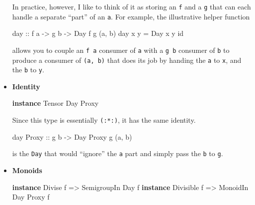 \documentclass[]{article}
\newenvironment{Shaded}{}{}
\newcommand{\DataTypeTok}[1]{\textcolor[rgb]{0.56,0.13,0.00}{#1}}
\newcommand{\FunctionTok}[1]{\textcolor[rgb]{0.02,0.16,0.49}{#1}}
\newcommand{\KeywordTok}[1]{\textcolor[rgb]{0.00,0.44,0.13}{\textbf{#1}}}
\newcommand{\NormalTok}[1]{#1}
\newcommand{\OtherTok}[1]{\textcolor[rgb]{0.00,0.44,0.13}{#1}}
\begin{document}
\begin{itemize}
  In practice, however, I like to think of it as storing an \texttt{f} and a
  \texttt{g} that can each handle a separate ``part'' of an \texttt{a}. For
  example, the illustrative helper function

\begin{Shaded}
\begin{Highlighting}[]
\OtherTok{day ::}\NormalTok{ f a }\OtherTok{{-}\textgreater{}}\NormalTok{ g b }\OtherTok{{-}\textgreater{}} \DataTypeTok{Day}\NormalTok{ f g (a, b)}
\NormalTok{day x y }\OtherTok{=} \DataTypeTok{Day}\NormalTok{ x y }\FunctionTok{id}
\end{Highlighting}
\end{Shaded}

  allows you to couple an \texttt{f\ a} consumer of \texttt{a} with a
  \texttt{g\ b} consumer of \texttt{b} to produce a consumer of \texttt{(a,\ b)}
  that does its job by handing the \texttt{a} to \texttt{x}, and the \texttt{b}
  to \texttt{y}.
\item
  \textbf{Identity}

\begin{Shaded}
\begin{Highlighting}[]
\KeywordTok{instance} \DataTypeTok{Tensor} \DataTypeTok{Day} \DataTypeTok{Proxy}
\end{Highlighting}
\end{Shaded}

  Since this type is essentially \texttt{(:*:)}, it has the same identity.

\begin{Shaded}
\begin{Highlighting}[]
\NormalTok{day }\DataTypeTok{Proxy}\OtherTok{ ::}\NormalTok{ g b }\OtherTok{{-}\textgreater{}} \DataTypeTok{Day} \DataTypeTok{Proxy}\NormalTok{ g (a, b)}
\end{Highlighting}
\end{Shaded}

  is the \texttt{Day} that would ``ignore'' the \texttt{a} part and simply pass
  the \texttt{b} to \texttt{g}.
\item
  \textbf{Monoids}

\begin{Shaded}
\begin{Highlighting}[]
\KeywordTok{instance} \DataTypeTok{Divise}\NormalTok{    f }\OtherTok{=\textgreater{}} \DataTypeTok{SemigroupIn} \DataTypeTok{Day}\NormalTok{ f}
\KeywordTok{instance} \DataTypeTok{Divisible}\NormalTok{ f }\OtherTok{=\textgreater{}} \DataTypeTok{MonoidIn}    \DataTypeTok{Day} \DataTypeTok{Proxy}\NormalTok{ f}


\end{Highlighting}
\end{Shaded}
\end{itemize}
\end{document}
